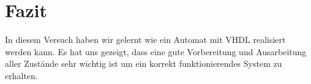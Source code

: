 
\section{Fazit}

In diesem Versuch haben wir gelernt wie ein Automat mit VHDL realisiert werden kann. Es hat uns gezeigt, dass eine gute Vorbereitung und Ausarbeitung aller Zustände sehr wichtig ist um ein korrekt funktionierendes System zu erhalten.

